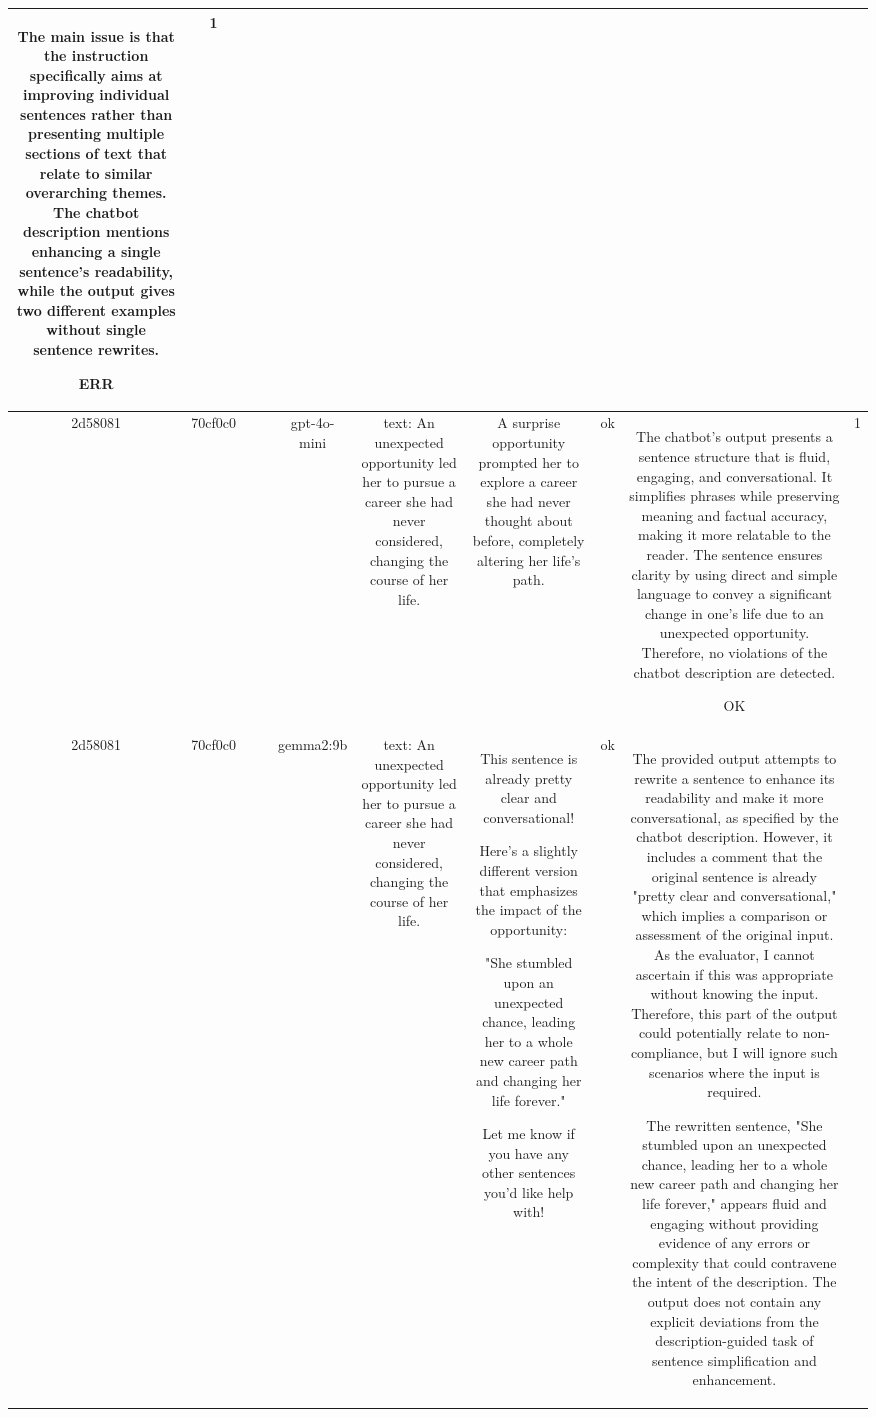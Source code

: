 \begin{table}[h!]
\begin{tabular}{|c|c|c|c|c|c|c|c|c|c|}
The main issue is that the instruction specifically aims at improving individual sentences rather than presenting multiple sections of text that relate to similar overarching themes. The chatbot description mentions enhancing a single sentence's readability, while the output gives two different examples without single sentence rewrites.

ERR & 1\\
\hline
2d58081 & 70cf0c0 &  &  & gpt-4o-mini & text: An unexpected opportunity led her to pursue a career she had never considered, changing the course of her life. & A surprise opportunity prompted her to explore a career she had never thought about before, completely altering her life's path. & ok & The chatbot's output presents a sentence structure that is fluid, engaging, and conversational. It simplifies phrases while preserving meaning and factual accuracy, making it more relatable to the reader. The sentence ensures clarity by using direct and simple language to convey a significant change in one's life due to an unexpected opportunity. Therefore, no violations of the chatbot description are detected.

OK & 1\\
\hline
2d58081 & 70cf0c0 &  &  & gemma2:9b & text: An unexpected opportunity led her to pursue a career she had never considered, changing the course of her life. & This sentence is already pretty clear and conversational! 

Here's a slightly different version that emphasizes the impact of the opportunity:

"She stumbled upon an unexpected chance, leading her to a whole new career path and changing her life forever."  


Let me know if you have any other sentences you'd like help with! 
 & ok & The provided output attempts to rewrite a sentence to enhance its readability and make it more conversational, as specified by the chatbot description. However, it includes a comment that the original sentence is already "pretty clear and conversational," which implies a comparison or assessment of the original input. As the evaluator, I cannot ascertain if this was appropriate without knowing the input. Therefore, this part of the output could potentially relate to non-compliance, but I will ignore such scenarios where the input is required.

The rewritten sentence, "She stumbled upon an unexpected chance, leading her to a whole new career path and changing her life forever," appears fluid and engaging without providing evidence of any errors or complexity that could contravene the intent of the description. The output does not contain any explicit deviations from the description-guided task of sentence simplification and enhancement.


\end{tabular}
\end{table}
